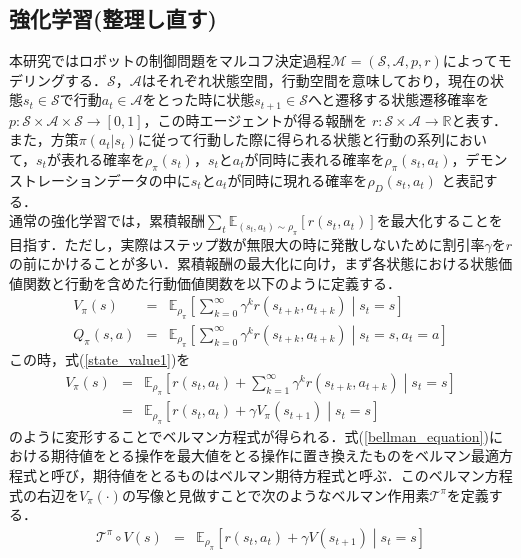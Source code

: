 \documentclass[dvipdfmx]{ampbt_nomag}
\begin{document}
\subsection{強化学習(整理し直す)}
本研究ではロボットの制御問題をマルコフ決定過程$\mathcal{M} = (\mathcal{S},\mathcal{A},p,r)$によってモデリングする．$\mathcal{S}$，$\mathcal{A}$はそれぞれ状態空間，行動空間を意味しており，現在の状態$s_t \in \mathcal{S}$で行動$a_t \in \mathcal{A}$をとった時に状態$s_{t+1}\in\mathcal{S}$へと遷移する状態遷移確率を$ p:\mathcal{S}\times\mathcal{A}\times\mathcal{S}\rightarrow[0,1]$，この時エージェントが得る報酬を $r:\mathcal{S}\times\mathcal{A}\rightarrow\mathbb{R}$と表す．また，方策$\pi(a_t|s_t)$に従って行動した際に得られる状態と行動の系列において，$s_t$が表れる確率を$\rho_\pi(s_t)$，$s_t$と$a_t$が同時に表れる確率を$\rho_\pi(s_t,a_t)$，デモンストレーションデータの中に$s_t$と$a_t$が同時に現れる確率を$\rho_D(s_t,a_t)$ と表記する．\\
通常の強化学習では，累積報酬$\sum_t \mathbb{E}_{(s_t,a_t)\sim\rho_\pi}[r(s_t, a_t)]$を最大化することを目指す．ただし，実際はステップ数が無限大の時に発散しないために割引率$\gamma$を$r$の前にかけることが多い．累積報酬の最大化に向け，まず各状態における状態価値関数と行動を含めた行動価値関数を以下のように定義する．
\begin{eqnarray} \label{state_value1}
  V_\pi(s) &=& \mathbb{E}_{\rho_\pi} \left[\sum^{\infty}_{k=0}\gamma^kr(s_{t+k},a_{t+k}) \middle|s_t = s\right] \\
  \label{state_value2}
  Q_\pi(s,a) &=& \mathbb{E}_{\rho_\pi} \left[\sum^{\infty}_{k=0}\gamma^kr(s_{t+k},a_{t+k}) \middle|s_t = s, a_t = a \right]
\end{eqnarray}
この時，式(\ref{state_value1})を
\begin{eqnarray} \label{bellman_equation}
  V_\pi(s) &=& \mathbb{E}_{\rho_\pi} \left[ r(s_t,a_t) + \sum^{\infty}_{k=1} \gamma^{k}r(s_{t+k},a_{t+k}) \middle|s_t = s\right] \\ \nonumber
  &=& \mathbb{E}_{\rho_\pi} \left[ r(s_t,a_t) + \gamma V_\pi(s_{t+1}) \middle|s_t = s\right]
\end{eqnarray}
のように変形することでベルマン方程式が得られる．式(\ref{bellman_equation})における期待値をとる操作を最大値をとる操作に置き換えたものをベルマン最適方程式と呼び，期待値をとるものはベルマン期待方程式と呼ぶ．このベルマン方程式の右辺を$V_\pi(\cdot)$の写像と見做すことで次のようなベルマン作用素$\mathcal{T}^\pi$を定義する．
\begin{eqnarray} \label{bellman_operator}
  \mathcal{T}^\pi\circ V(s) &=&  \mathbb{E}_{\rho_\pi} \left[ r(s_t,a_t) + \gamma V(s_{t+1}) \middle|s_t = s\right]
\end{eqnarray}
\end{document}
